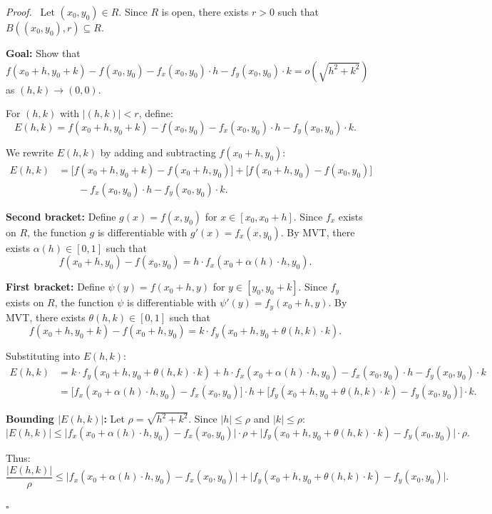 \documentclass[11pt]{report}
\renewenvironment{proof}[1][Proof]{\par\noindent\textit{#1.}\ }{\hfill$\square$\par\medskip}
\begin{document}
\begin{proof}
Let $(x_0, y_0) \in R$. Since $R$ is open, there exists $r > 0$ such that $B((x_0, y_0), r) \subseteq R$.

\textbf{Goal:} Show that
\[
f(x_0 + h, y_0 + k) - f(x_0, y_0) - f_x(x_0, y_0) \cdot h - f_y(x_0, y_0) \cdot k = o(\sqrt{h^2 + k^2})
\]
as $(h, k) \to (0, 0)$.

For $(h, k)$ with $|(h, k)| < r$, define:
\[
E(h, k) = f(x_0 + h, y_0 + k) - f(x_0, y_0) - f_x(x_0, y_0) \cdot h - f_y(x_0, y_0) \cdot k.
\]

We rewrite $E(h, k)$ by adding and subtracting $f(x_0 + h, y_0)$:
\begin{align*}
E(h, k) &= \bigl[f(x_0 + h, y_0 + k) - f(x_0 + h, y_0)\bigr] + \bigl[f(x_0 + h, y_0) - f(x_0, y_0)\bigr] \\
&\qquad - f_x(x_0, y_0) \cdot h - f_y(x_0, y_0) \cdot k.
\end{align*}

\textbf{Second bracket:} Define $g(x) = f(x, y_0)$ for $x \in [x_0, x_0 + h]$. Since $f_x$ exists on $R$, the function $g$ is differentiable with $g'(x) = f_x(x, y_0)$. By MVT, there exists $\alpha(h) \in [0, 1]$ such that
\[
f(x_0 + h, y_0) - f(x_0, y_0) = h \cdot f_x(x_0 + \alpha(h) \cdot h, y_0).
\]

\textbf{First bracket:} Define $\psi(y) = f(x_0 + h, y)$ for $y \in [y_0, y_0 + k]$. Since $f_y$ exists on $R$, the function $\psi$ is differentiable with $\psi'(y) = f_y(x_0 + h, y)$. By MVT, there exists $\theta(h, k) \in [0, 1]$ such that
\[
f(x_0 + h, y_0 + k) - f(x_0 + h, y_0) = k \cdot f_y(x_0 + h, y_0 + \theta(h, k) \cdot k).
\]

Substituting into $E(h, k)$:
\begin{align*}
E(h, k) &= k \cdot f_y(x_0 + h, y_0 + \theta(h, k) \cdot k) + h \cdot f_x(x_0 + \alpha(h) \cdot h, y_0) - f_x(x_0, y_0) \cdot h - f_y(x_0, y_0) \cdot k \\
&= \bigl[f_x(x_0 + \alpha(h) \cdot h, y_0) - f_x(x_0, y_0)\bigr] \cdot h + \bigl[f_y(x_0 + h, y_0 + \theta(h, k) \cdot k) - f_y(x_0, y_0)\bigr] \cdot k.
\end{align*}

\textbf{Bounding $|E(h, k)|$:} Let $\rho = \sqrt{h^2 + k^2}$. Since $|h| \leq \rho$ and $|k| \leq \rho$:
\[
|E(h, k)| \leq \bigl|f_x(x_0 + \alpha(h) \cdot h, y_0) - f_x(x_0, y_0)\bigr| \cdot \rho + \bigl|f_y(x_0 + h, y_0 + \theta(h, k) \cdot k) - f_y(x_0, y_0)\bigr| \cdot \rho.
\]

Thus:
\[
\frac{|E(h, k)|}{\rho} \leq \bigl|f_x(x_0 + \alpha(h) \cdot h, y_0) - f_x(x_0, y_0)\bigr| + \bigl|f_y(x_0 + h, y_0 + \theta(h, k) \cdot k) - f_y(x_0, y_0)\bigr|.
\]


\end{proof}
\end{document}

